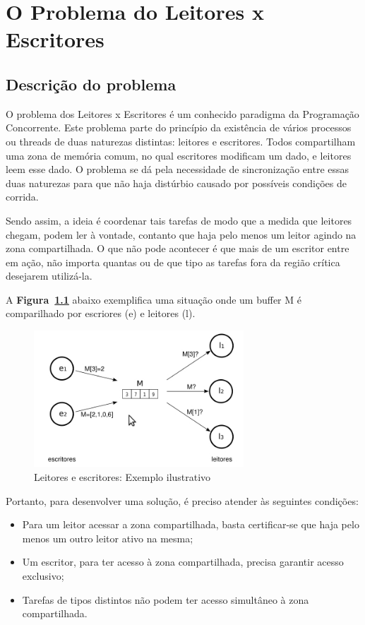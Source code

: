 \documentclass[
	12pt,				%
	openright,			%
	oneside,			%
	a4paper,			%
	chapter=TITLE,		%
	english,			%
	french,				%
	spanish,			%
	brazil				%
	]{abntex2}
\theoremstyle{definition}
\begin{document}
\chapter{O Problema do Leitores x Escritores}

\section{Descrição do problema}
O problema dos Leitores x Escritores é um conhecido paradigma da Programação Concorrente. Este problema parte do princípio da existência de vários processos ou threads de duas naturezas distintas: leitores e escritores. Todos compartilham uma zona de memória comum, no qual escritores modificam um dado, e leitores leem esse dado. O problema se dá pela necessidade de sincronização entre essas duas naturezas para que não haja distúrbio causado por possíveis condições de corrida. 

Sendo assim, a ideia é coordenar tais tarefas de modo que a medida que leitores chegam, podem ler à vontade, contanto que haja pelo menos um leitor agindo na zona compartilhada. O que não pode acontecer é que mais de um escritor entre em ação, não importa quantas ou de que tipo as tarefas fora da região crítica desejarem utilizá-la.

A \textbf{Figura~\ref{fig:ex_leitor_escritor}} abaixo exemplifica uma situação onde um buffer M é comparilhado por escriores (e) e leitores (l).

\begin{figure}[h]
    \centering
    \includegraphics[width=0.7\textwidth]{imagens/leitor_escritor.jpg}
    \caption{Leitores e escritores: Exemplo ilustrativo}
    \label{fig:ex_leitor_escritor}
\end{figure}

Portanto, para desenvolver uma solução, é preciso atender às seguintes condições:

\begin{itemize}
    \item Para um leitor acessar a zona compartilhada, basta certificar-se que haja pelo menos um outro leitor ativo na mesma;
    \item Um escritor, para ter acesso à zona compartilhada, precisa garantir acesso exclusivo;
    \item Tarefas de tipos distintos não podem ter acesso simultâneo à zona compartilhada.
\end{itemize}
\end{document}
